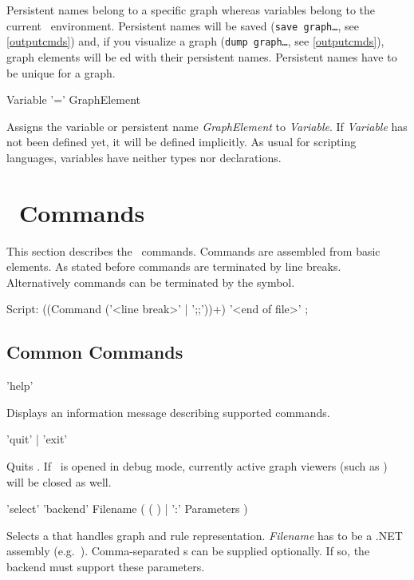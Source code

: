 \begin{note}
Persistent names belong to a specific graph whereas variables belong to the current \GrShell\ environment. Persistent names will be saved (\texttt{save graph\dots}, see \ref{outputcmds}) and, if you visualize a graph (\texttt{dump graph\dots}, see \ref{outputcmds}), graph elements will be ed with their persistent names. Persistent names have to be unique for a graph.
\end{note}

\begin{rail}
  Variable '=' GraphElement   
\end{rail}
Assigns the variable or persistent name \emph{GraphElement} to \emph{Variable}. If \emph{Variable} has not been defined yet, it will be defined implicitly. As usual for scripting languages, variables have neither types nor declarations.

\section{\GrShell\ Commands}
This section describes the \GrShell\ commands. Commands are assembled from basic elements. As stated before commands are terminated by line breaks. Alternatively commands can be terminated by the \indexed{\texttt{;;}} symbol.
\begin{rail}
  Script: ((Command ('<line break>' | ';;'))+) '<end of file>' ;
\end{rail}

\subsection{Common Commands}
\label{commcommands}
\begin{rail}
  'help'
\end{rail}
Displays an information message describing supported commands. 

\begin{rail}
  'quit' | 'exit'
\end{rail}
Quits \GrShell. If \GrShell\ is opened in debug mode, currently active graph viewers (such as \yComp) will be closed as well.

\begin{rail}
  'select' 'backend' Filename ( ( ) | ':' Parameters )
\end{rail}
Selects a  that handles graph and rule representation. \emph{Filename} has to be a .NET assembly (e.g.\ \texttt{}).
Comma-separated s can be supplied optionally. If so, the backend must support these parameters.

